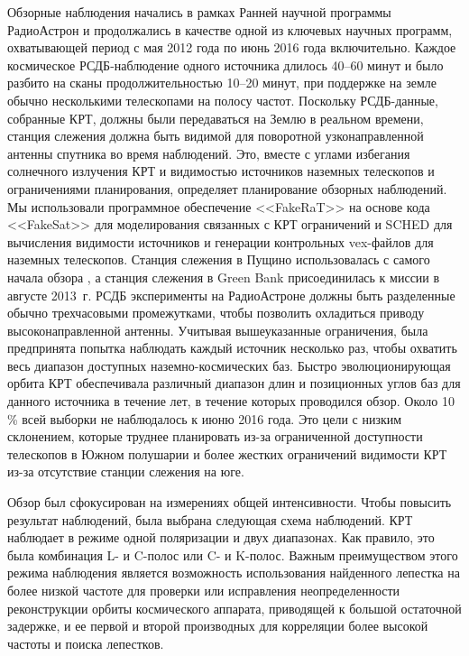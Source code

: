 Обзорные наблюдения начались в рамках Ранней научной программы РадиоАстрон и продолжались в качестве
одной из ключевых научных программ, охватывающей период с мая 2012 года по июнь 2016 года
включительно. Каждое космическое РСДБ-наблюдение одного источника длилось 40--60 минут и было
разбито на сканы продолжительностью 10--20 минут, при поддержке на земле обычно несколькими
телескопами на полосу частот. Поскольку РСДБ-данные, собранные КРТ, должны были передаваться на
Землю в реальном времени, станция слежения должна быть видимой для поворотной узконаправленной
антенны спутника во время наблюдений. Это, вместе с углами избегания солнечного излучения КРТ и
видимостью источников наземных телескопов и ограничениями планирования, определяет планирование
обзорных наблюдений. Мы использовали программное обеспечение <<FakeRaT>> \cite{Zhuravlev_2015_rus}
на основе кода <<FakeSat>> \cite{Murphy_1991,Murphy_1994,Smith_2000} для моделирования связанных с
КРТ ограничений и SCHED для вычисления видимости источников и генерации контрольных vex-файлов для
наземных телескопов. Станция слежения в Пущино использовалась с самого начала обзора
\cite{Kardashev_2013_rus}, а станция слежения в Green Bank \cite{Ford_2014} присоединилась к миссии
в августе 2013~г. РСДБ эксперименты на РадиоАстроне должны быть разделенные обычно трехчасовыми
промежутками, чтобы позволить охладиться приводу высоконаправленной антенны. Учитывая вышеуказанные
ограничения, была предпринята попытка наблюдать каждый источник несколько раз, чтобы охватить весь
диапазон доступных наземно-космических баз. Быстро эволюционирующая орбита КРТ обеспечивала
различный диапазон длин и позиционных углов баз для данного источника в течение лет, в течение
которых проводился обзор. Около 10\,\% всей выборки не наблюдалось к июню 2016 года. Это цели с
низким склонением, которые труднее планировать из-за ограниченной доступности телескопов в Южном
полушарии и более жестких ограничений видимости КРТ из-за отсутствие станции слежения на юге.

Обзор был сфокусирован на измерениях общей интенсивности. Чтобы повысить результат
наблюдений, была выбрана следующая схема наблюдений. КРТ наблюдает в режиме одной поляризации
и двух диапазонах. Как правило, это была комбинация L- и C-полос или C- и K-полос. Важным
преимуществом этого режима наблюдения является возможность использования найденного лепестка на
более низкой частоте для проверки или исправления неопределенности реконструкции орбиты
космического аппарата, приводящей к большой остаточной задержке, и ее первой и второй производных
для корреляции более высокой частоты и поиска лепестков.

